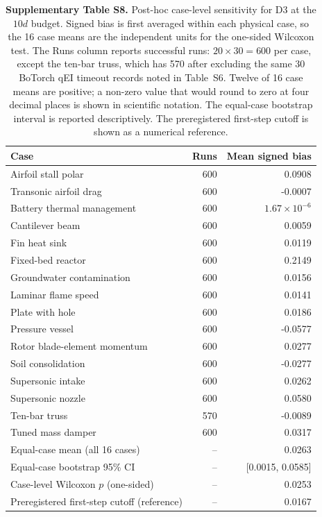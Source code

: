 \begin{table}[htbp]
\centering
\caption{\textbf{Supplementary Table S8.} Post-hoc case-level sensitivity for D3 at the $10d$ budget. Signed bias is first averaged within each physical case, so the 16 case means are the independent units for the one-sided Wilcoxon test. The Runs column reports successful runs: $20\times30=600$ per case, except the ten-bar truss, which has 570 after excluding the same 30 BoTorch qEI timeout records noted in Table~S6. Twelve of 16 case means are positive; a non-zero value that would round to zero at four decimal places is shown in scientific notation. The equal-case bootstrap interval is reported descriptively. The preregistered first-step cutoff is shown as a numerical reference.}
\label{tab:si_d3_case_level}
\SITableFont
\setlength{\tabcolsep}{5pt}
\begin{tabular}{@{}lrr@{}}
\toprule
\textbf{Case} & \textbf{Runs} & \textbf{Mean signed bias} \\
\midrule
Airfoil stall polar & 600 & 0.0908 \\
Transonic airfoil drag & 600 & -0.0007 \\
Battery thermal management & 600 & $1.67\times10^{-6}$ \\
Cantilever beam & 600 & 0.0059 \\
Fin heat sink & 600 & 0.0119 \\
Fixed-bed reactor & 600 & 0.2149 \\
Groundwater contamination & 600 & 0.0156 \\
Laminar flame speed & 600 & 0.0141 \\
Plate with hole & 600 & 0.0186 \\
Pressure vessel & 600 & -0.0577 \\
Rotor blade-element momentum & 600 & 0.0277 \\
Soil consolidation & 600 & -0.0277 \\
Supersonic intake & 600 & 0.0262 \\
Supersonic nozzle & 600 & 0.0580 \\
Ten-bar truss & 570 & -0.0089 \\
Tuned mass damper & 600 & 0.0317 \\
\midrule
Equal-case mean (all 16 cases) & -- & 0.0263 \\
Equal-case bootstrap 95\% CI & -- & [0.0015, 0.0585] \\
Case-level Wilcoxon $p$ (one-sided) & -- & 0.0253 \\
Preregistered first-step cutoff (reference) & -- & 0.0167 \\
\bottomrule
\end{tabular}
\end{table}
